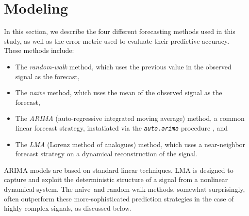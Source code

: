 \documentclass[%
pre,
reprint,
superscriptaddress,
showpacs,
nofootinbib,
nobibnotes,
 amsmath,amssymb,
 aps,
]{revtex4-1}
\newcommand{\cmark}{\ding{51}}
\newcommand{\arima}{{\tt auto.arima}\xspace}
\newcommand{\naive}{na\"ive}
\begin{document}

\section{Modeling }\label{sec:model}
%
%
%
%

In this section, we describe the four different forecasting methods
used in this study, as well as the error metric used to evaluate their
predictive accuracy.  These methods include:
\begin{itemize}
\item The \emph{random-walk} method, which uses the previous value in
  the observed signal as the forecast,

\item The \emph{\naive} method, which uses the mean of the
  observed signal as the forecast,

\item The \emph{ARIMA} (auto-regressive integrated moving average)
  method, a common linear forecast strategy, instatiated via the
  \emph{\arima} procedure \cite{autoARIMA}, and

\item The \emph{LMA} (Lorenz method of analogues) method, which uses a
  near-neighbor forecast strategy on a dynamical reconstruction of the
  signal.
\end{itemize}
ARIMA models are based on standard linear techniques.  LMA is designed
to capture and exploit the deterministic structure of a signal from a
nonlinear dynamical system.  The \naive ~and random-walk methods,
somewhat surprisingly, often outperform these more-sophisticated
prediction strategies in the case of highly complex signals, as
discussed below.
\end{document}
